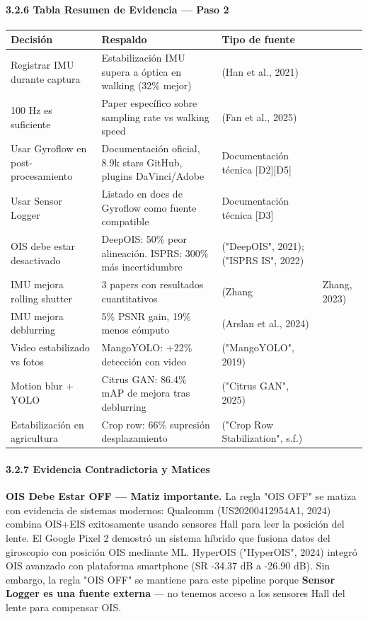 \paragraph{3.2.6 Tabla Resumen de Evidencia — Paso 2}



\begin{tabular}{lll}
\hline
Decisión & Respaldo & Tipo de fuente \\
\hline
Registrar IMU durante captura & Estabilización IMU supera a óptica en walking (32\% mejor) & (Han et al., 2021) \\
100 Hz es suficiente & Paper específico sobre sampling rate vs walking speed & (Fan et al., 2025) \\
Usar Gyroflow en post-procesamiento & Documentación oficial, 8.9k stars GitHub, plugins DaVinci/Adobe & Documentación técnica [D2][D5] \\
Usar Sensor Logger & Listado en docs de Gyroflow como fuente compatible & Documentación técnica [D3] \\
OIS debe estar desactivado & DeepOIS: 50\% peor alineación. ISPRS: 300\% más incertidumbre & ("DeepOIS", 2021); ("ISPRS IS", 2022) \\
IMU mejora rolling shutter & 3 papers con resultados cuantitativos & (Zhang & Zhang, 2023) \\
IMU mejora deblurring & 5\% PSNR gain, 19\% menos cómputo & (Arslan et al., 2024) \\
Video estabilizado vs fotos & MangoYOLO: +22\% detección con video & ("MangoYOLO", 2019) \\
Motion blur + YOLO & Citrus GAN: 86.4\% mAP de mejora tras deblurring & ("Citrus GAN", 2025) \\
Estabilización en agricultura & Crop row: 66\% supresión desplazamiento & ("Crop Row Stabilization", s.f.) \\
\hline
\end{tabular}


\paragraph{3.2.7 Evidencia Contradictoria y Matices}


\textbf{OIS Debe Estar OFF — Matiz importante.} La regla "OIS OFF" se matiza con evidencia de sistemas modernos: Qualcomm (US20200412954A1, 2024) combina OIS+EIS exitosamente usando sensores Hall para leer la posición del lente. El Google Pixel 2 demostró un sistema híbrido que fusiona datos del giroscopio con posición OIS mediante ML. HyperOIS ("HyperOIS", 2024) integró OIS avanzado con plataforma smartphone (SR -34.37 dB a -26.90 dB). Sin embargo, la regla "OIS OFF" se mantiene para este pipeline porque \textbf{Sensor Logger es una fuente externa} — no tenemos acceso a los sensores Hall del lente para compensar OIS.


